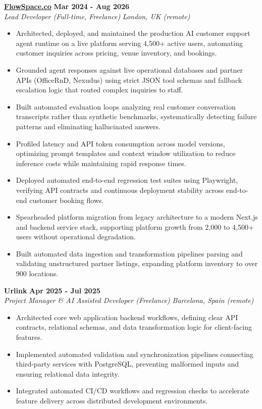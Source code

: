 \documentclass[10pt,a4paper]{article}
\newcommand{\role}[4]{%
  \textbf{#1} \hfill \textbf{#2}\\[1pt]%
  \textit{#3} \hfill \textit{#4}\\[2pt]%
}
\begin{document}
\role{\href{https://flowspace.co}{FlowSpace.co}}{Mar 2024 - Aug 2026}{Lead Developer (Full-time, Freelance)}{London, UK (remote)}
\begin{itemize}
  \item Architected, deployed, and maintained the production AI customer support agent runtime on a live platform serving 4,500+ active users, automating customer inquiries across pricing, venue inventory, and bookings.
  \item Grounded agent responses against live operational databases and partner APIs (OfficeRnD, Nexudus) using strict JSON tool schemas and fallback escalation logic that routed complex inquiries to staff.
  \item Built automated evaluation loops analyzing real customer conversation transcripts rather than synthetic benchmarks, systematically detecting failure patterns and eliminating hallucinated answers.
  \item Profiled latency and API token consumption across model versions, optimizing prompt templates and context window utilization to reduce inference costs while maintaining rapid response times.
  \item Deployed automated end-to-end regression test suites using Playwright, verifying API contracts and continuous deployment stability across end-to-end customer booking flows.
  \item Spearheaded platform migration from legacy architecture to a modern Next.js and backend service stack, supporting platform growth from 2,000 to 4,500+ users without operational degradation.
  \item Built automated data ingestion and transformation pipelines parsing and validating unstructured partner listings, expanding platform inventory to over 900 locations.
\end{itemize}

\role{Urlink}{Apr 2025 - Jul 2025}{Project Manager \& AI Assisted Developer (Freelance)}{Barcelona, Spain (remote)}
\begin{itemize}
  \item Architected core web application backend workflows, defining clear API contracts, relational schemas, and data transformation logic for client-facing features.
  \item Implemented automated validation and synchronization pipelines connecting third-party services with PostgreSQL, preventing malformed inputs and ensuring relational data integrity.
  \item Integrated automated CI/CD workflows and regression checks to accelerate feature delivery across distributed development environments.
\end{itemize}
\end{document}
